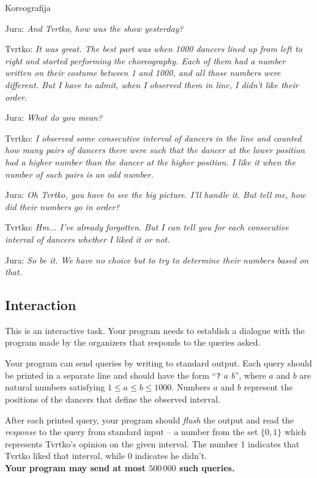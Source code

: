 \begin{statement}[
  problempoints=100,
  timelimit=8 seconds,
  memorylimit=1024 MiB,
]{Koreografija}

Jura: \textit{And Tvrtko, how was the show yesterday?}

Tvrtko: \textit{It was great. The best part was when 1000 dancers lined up
from left to right and started performing the choreography. Each of them had a number
written on their costume between 1 and 1000, and all those numbers were different.
But I have to admit, when I observed them in line, I didn't like their order.}

Jura: \textit{What do you mean?}

Tvrtko: \textit{I observed some consecutive interval of dancers in the line and counted
how many pairs of dancers there were such that the dancer at the lower position had a higher number than the dancer at the higher position.
I like it when the number of such pairs is an odd number.}

Jura: \textit{Oh Tvrtko, you have to see the big picture. I'll handle it. But tell me, how did their numbers go in order?}

Tvrtko: \textit{Hm... I've already forgotten. But I can tell you for each consecutive interval of dancers whether I liked it or not.}

Jura: \textit{So be it. We have no choice but to try to determine their numbers based on that.}

\subsection*{Interaction}
This is an interactive task. Your program needs to establish a dialogue with the program
made by the organizers that responds to the queries asked.

Your program can send queries by writing to standard output. Each query should 
be printed in a separate line and should have the form 
``\texttt{?} \textit{a b}'', where $a$ and $b$  
are natural numbers satisfying $1 \leq a \leq b \leq 1000$. Numbers 
$a$ and $b$ represent the positions of the dancers that define the observed interval. 

After each printed query, your program
should \textit{flush} the output and read the 
\textit{response} to the query from standard input -- a number from the set $\{0, 1\}$ which represents 
Tvrtko's opinion on the given interval. 
The number 1 indicates that Tvrtko liked that interval, while 0 indicates he didn't. \\
\textbf{Your program may send at most $500\,000$ such queries.}



\end{statement}
